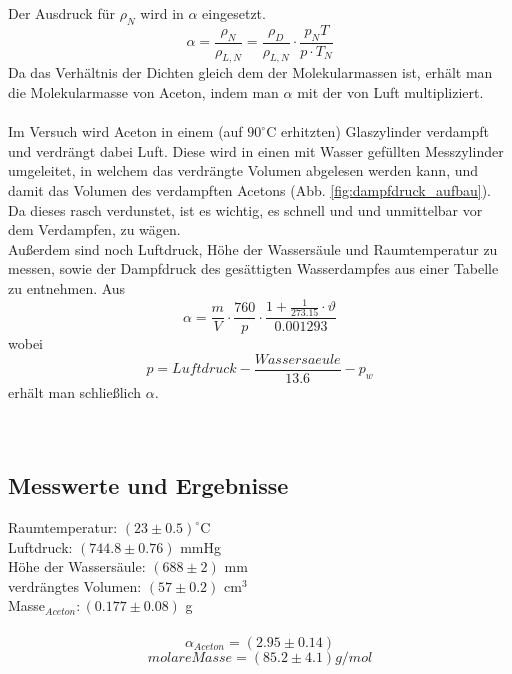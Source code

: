 \documentclass[12pt,a4paper]{article}
\begin{document}
\begin{multicols}{2}
\noindent
Der Ausdruck für $\rho_N$ wird in $\alpha$ eingesetzt.
$$\alpha = \frac{\rho_N}{\rho_{L,N}}=\frac{\rho_D}{\rho_{L,N}} \cdot \frac{p_N T}{p \cdot T_N}$$
Da das Verhältnis der Dichten gleich dem der Molekularmassen ist, erhält man die Molekularmasse von Aceton, indem man $\alpha$ mit der von Luft multipliziert.\\
\\
Im Versuch wird Aceton in einem (auf $90^\circ$C erhitzten) Glaszylinder verdampft und verdrängt dabei Luft. Diese wird in einen mit Wasser gefüllten Messzylinder umgeleitet, in welchem das verdrängte Volumen abgelesen werden kann, und damit das Volumen des verdampften Acetons (Abb. \ref{fig:dampfdruck_aufbau}).
Da dieses rasch verdunstet, ist es wichtig, es schnell und und unmittelbar vor dem Verdampfen, zu wägen.\\
Außerdem sind noch Luftdruck, Höhe der Wassersäule und Raumtemperatur zu messen, sowie der Dampfdruck des gesättigten Wasserdampfes aus einer Tabelle zu entnehmen. Aus
$$\alpha = \frac{m}{V} \cdot \frac{760}{p} \cdot \frac{1 + \frac{1}{273.15} \cdot \vartheta}{0.001293}$$
wobei
$$p= Luftdruck - \frac{Wassersaeule}{13.6} - p_w$$
erhält man schließlich $\alpha$.\\
\\
\\


\subsection{Messwerte und Ergebnisse}

Raumtemperatur: $(23\pm 0.5)^\circ$C\\
Luftdruck: $(744.8 \pm 0.76)$ mmHg\\
Höhe der Wassersäule: $(688 \pm 2)$ mm\\
verdrängtes Volumen: $(57 \pm 0.2)$ cm$^3$\\
Masse$_{Aceton}: (0.177 \pm 0.08)$ g\\
\\
$$\alpha_{Aceton} = (2.95 \pm 0.14)$$
$$molare Masse = (85.2 \pm 4.1) g/mol$$\\
\\
\\




\end{multicols}
\end{document}
